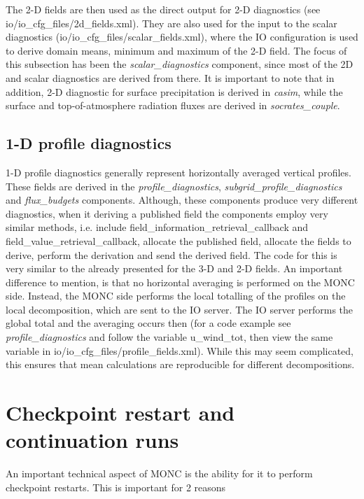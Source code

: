 \documentclass[a4paper,11pt]{article}
\begin{document}
The 2-D fields are then used as the direct output for 2-D diagnostics (see
io/io\_cfg\_files/2d\_fields.xml). They are also used for the input to the
scalar diagnostics (io/io\_cfg\_files/scalar\_fields.xml), where the IO configuration
is used to derive domain means, minimum and maximum of the 2-D field. The
focus of this subsection has been the \emph{scalar\_diagnostics} component, since
most of the 2D and scalar diagnostics are derived from there. It is important
to note that in addition, 2-D diagnostic for surface precipitation is derived in
\emph{casim}, while the surface and top-of-atmosphere radiation fluxes are derived
in \emph{socrates\_couple}.

\subsection{1-D profile diagnostics}

1-D profile diagnostics generally represent horizontally averaged vertical
profiles. These fields are derived in the \emph{profile\_diagnostics},
\emph{subgrid\_profile\_diagnostics} and \emph{flux\_budgets} components. Although,
these components produce very different diagnostics, when it deriving a published
field the components employ very similar methods, i.e. include
field\_information\_retrieval\_callback and field\_value\_retrieval\_callback,
allocate the published field, allocate the fields to derive, perform the derivation
and send the derived field. The code for this is very similar to the already
presented for the 3-D and 2-D fields. An important difference to mention, is that
no horizontal averaging is performed on the MONC side. Instead, the MONC side
performs the local totalling of the profiles on the local decomposition, which
are sent to the IO server. The IO server performs the global total and the
averaging occurs then (for a code example see \emph{profile\_diagnostics} and
follow the variable u\_wind\_tot, then view the same variable in
io/io\_cfg\_files/profile\_fields.xml). While this may seem complicated, this
ensures that mean calculations are reproducible for different decompositions.

\section{Checkpoint restart and continuation runs}

An important technical aspect of MONC is the ability for it to perform checkpoint
restarts. This is important for 2 reasons
\end{document}
